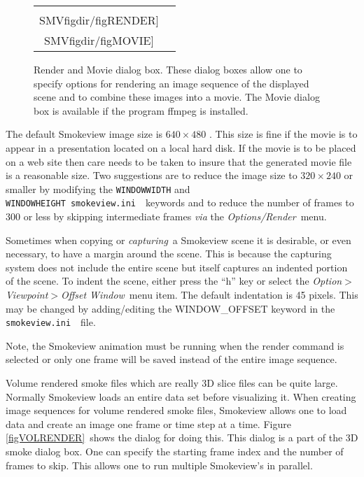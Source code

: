 \documentclass[11pt,twoside]{book}
\newcommand{\svini}{{\tt smokeview.ini}\ }
\begin{document}
\begin{figure}[bph]
\begin{center}
\begin{tabular}{cc}
\texttt{[image: \\SMVfigdir/figRENDER]}&
\texttt{[image: \\SMVfigdir/figMOVIE]}
\end{tabular}
\end{center}
\caption[Render and Movie dialog box.]{Render and Movie dialog box. These dialog boxes allow one to specify
options for rendering an image sequence of the displayed scene and to combine these images into a movie.  The Movie dialog box is available if the program ffmpeg is installed.}
\label{figRENDER}
\end{figure}

The default Smokeview image size is $640\times 480$ .  This size
is fine if the movie is to appear in a presentation located on a
local hard disk.  If the movie is to be placed on a web site then
care needs to be taken to insure that the generated movie file is
a reasonable size.  Two suggestions are to reduce the image size
to $320\times 240$ or smaller by modifying the {\tt WINDOWWIDTH}
and {\tt WINDOWHEIGHT}\ \svini\ keywords  and to reduce the number
of frames to 300 or less by skipping intermediate frames {\em via}
the {\em Options/Render}\ menu.

Sometimes when copying or {\em capturing}\ a Smokeview scene it is
desirable, or even necessary, to have a margin around the scene.
This is because the capturing system does not include the entire
scene but itself captures an indented portion of the scene. To
indent the scene, either press the ``h'' key or select the {\em
Option$>$Viewpoint$>$Offset Window}\ menu item. The default
indentation is 45 pixels. This may be changed by adding/editing
the WINDOW\_OFFSET keyword in the \svini\ file.

Note, the Smokeview animation must be running when the render command is
selected or only one frame will be saved instead of the entire image sequence.

Volume rendered smoke files which are really 3D slice files can be quite large.
Normally Smokeview loads an entire data set before visualizing it.
When creating image sequences for volume rendered smoke files,
Smokeview allows one to load data and create an image one frame or time step at a time.
Figure \ref{figVOLRENDER}\ shows the dialog for doing this.  This dialog
is a part of the 3D smoke dialog box. One can specify the starting frame index
and the number of frames to skip.  This allows one to run multiple Smokeview's in
parallel.
\end{document}
